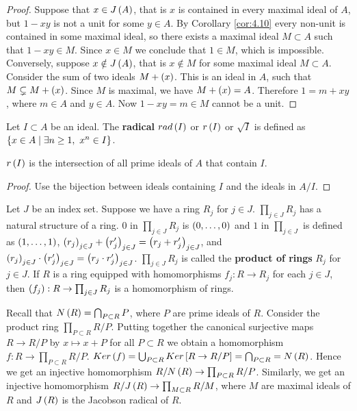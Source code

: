 \begin{proof}
Suppose that $ x \in J\left( A \right) $, that is $ x $ is contained in every maximal ideal of $ A $, but $ 1 - xy $ is not a unit for some $ y \in A $. By Corollary \ref{cor:4.10} every non-unit is contained in some maximal ideal, so there exists a maximal ideal $ M \subset A $ such that $ 1 - xy \in M $. Since $ x \in M $ we conclude that $ 1 \in M $, which is impossible. Conversely, suppose $ x \notin J\left( A \right) $, that is $ x \notin M $ for some maximal ideal $ M \subset A $. Consider the sum of two ideals $ M + \left( x \right) $. This is an ideal in $ A $, such that $ M \subsetneq M + \left( x \right) $. Since $ M $ is maximal, we have $ M + \left( x \right) = A $. Therefore $ 1 = m + xy $, where $ m \in A $ and $ y \in A $. Now $ 1 - xy = m \in M $ cannot be a unit.
\end{proof}

Let $ I \subset A $ be an ideal. The \textbf{radical} $ rad\left( I \right) $ or $ r\left( I \right) $ or $ \sqrt{I} $ is defined as $ \left\{ x \in A \mid \exists n \ge 1, \ x^n \in I \right\} $.

\begin{proposition}
$ r\left( I \right) $ is the intersection of all prime ideals of $ A $ that contain $ I $.
\end{proposition}

\begin{proof}
Use the bijection between ideals containing $ I $ and the ideals in $ A / I $.
\end{proof}


\begin{definition}
Let $ J $ be an index set. Suppose we have a ring $ R_j $ for $ j \in J $. $ \prod_{j \in J} R_j $ has a natural structure of a ring. $ 0 $ in $ \prod_{j \in J} R_j $ is $ \left( 0, \dots, 0 \right) $ and $ 1 $ in $ \prod_{j \in J} $ is defined as $ \left( 1, \dots, 1 \right) $, $ \left( r_j \right)_{j \in J} + \left( r'_j \right)_{j \in J} = \left( r_j + r'_j \right)_{j \in J} $, and $ \left( r_j \right)_{j \in J} \cdot \left( r'_j \right)_{j \in J} = \left( r_j \cdot r'_j \right)_{j \in J} $.
$ \prod_{j \in J} R_j $ is called the \textbf{product of rings} $ R_j $ for $ j \in J $. If $ R $ is a ring equipped with homomorphisms $ f_j : R \to R_j $ for each $ j \in J $, then $ \left( f_j \right) : R \to \prod_{j \in J} R_j $ is a homomorphism of rings.
\end{definition}

Recall that $ N\left( R \right) = \bigcap_{P \subset R} P $, where $ P $ are prime ideals of $ R $. Consider the product ring $ \prod_{P \subset R} R / P $. Putting together the canonical surjective maps $ R \to R / P $ by $ x \mapsto x + P $ for all $ P \subset R $ we obtain a homomorphism $ f : R \to \prod_{P \subset R} R / P $. $ Ker\left( f \right) = \bigcup_{P \subset R} Ker\left[ R \to R / P \right] = \bigcap_{P \subset R} = N\left( R \right) $. Hence we get an injective homomorphism $ R / N\left( R \right) \to \prod_{P \subset R} R / P $. Similarly, we get an injective homomorphism $ R / J\left( R \right) \to \prod_{M \subset R} R / M $, where $ M $ are maximal ideals of $ R $ and $ J\left( R \right) $ is the Jacobson radical of $ R $.

